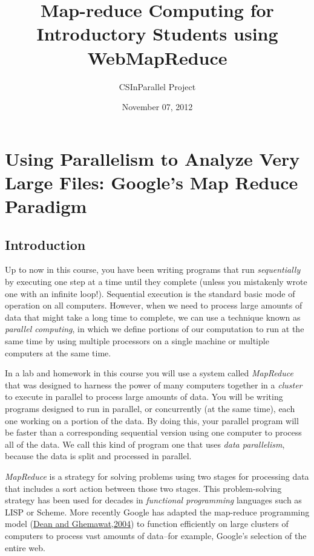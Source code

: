 \documentclass[letterpaper,10pt,openany,oneside]{sphinxmanual}
\title{Map-reduce Computing for Introductory Students using WebMapReduce}
\date{November 07, 2012}
\author{CSInParallel Project}
\begin{document}
\maketitle
\tableofcontents
{}\label{index::doc}



\chapter{Using Parallelism to Analyze Very Large Files: Google's Map Reduce Paradigm}
\label{MapReduceIntro/MapReduceIntro:map-reduce-computing-for-introductory-students-using-webmapreduce}\label{MapReduceIntro/MapReduceIntro::doc}\label{MapReduceIntro/MapReduceIntro:using-parallelism-to-analyze-very-large-files-google-s-map-reduce-paradigm}

\section{Introduction}
\label{MapReduceIntro/MapReduceIntro:introduction}
Up to now in this course, you have been writing programs that run
\emph{sequentially} by executing one step at a time until they complete
(unless you mistakenly wrote one with an infinite loop!).
Sequential execution is the standard basic mode of operation on all
computers. However, when we need to process large amounts of data
that might take a long time to complete, we can use a technique
known as \emph{parallel computing}, in which we define portions of our
computation to run at the same time by using multiple processors on
a single machine or multiple computers at the same time.

In a lab and homework in this course you will use a system called
\emph{MapReduce} that was designed to harness the power of many
computers together in a \emph{cluster} to execute in parallel to process
large amounts of data. You will be writing programs designed to run
in parallel, or concurrently (at the same time), each one working
on a portion of the data. By doing this, your parallel program will
be faster than a corresponding sequential version using one
computer to process all of the data. We call this kind of program
one that uses \emph{data parallelism}, because the data is split and
processed in parallel.

\emph{MapReduce} is a strategy for solving problems using two stages for
processing data that includes a sort action between those two
stages. This problem-solving strategy has been used for decades in
\emph{functional programming} languages such as LISP or Scheme. More
recently Google has adapted the map-reduce programming model
(\href{http://labs.google.com/papers/mapreduce.html}{Dean and Ghemawat,2004})
to function efficiently on large clusters of computers to process
vast amounts of data--for example, Google's selection of the entire
web.
\end{document}
